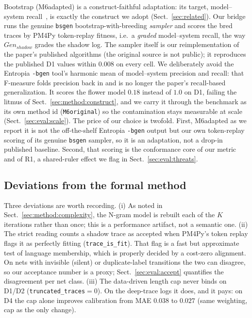 \documentclass[runningheads]{llncs}
\newcommand{\chg}[1]{\textcolor{chgblue}{#1}}
\newcommand{\genshadow}{\ensuremath{\mathit{Gen}_{\mathit{shadow}}}}
\begin{document}
Bootstrap (M6adapted) is a construct-faithful adaptation: its target, model--system recall~\cite{polyvyanyy2022bootstrap}, is exactly the construct we adopt (Sect.~\ref{sec:related}). Our bridge runs the genuine \texttt{bsgen} bootstrap-with-breeding \emph{sampler} and scores the bred traces by PM4Py token-replay fitness, i.e.\ a \emph{graded} model--system recall, the way \genshadow{} grades the shadow log. \chg{The sampler itself is our reimplementation of the paper's published algorithms (the original source is not public); it reproduces the published D1 values within $0.008$ on every cell.} We deliberately avoid the Entropia \texttt{-bgen} tool's harmonic mean of model--system precision and recall: that F-measure folds precision back in and is no longer the paper's recall-based generalization. It scores the flower model $0.18$ instead of $1.0$ on D1, failing the litmus of Sect.~\ref{sec:method:construct}\chg{, and we carry it through the benchmark as its own method id (\texttt{M6original}) so the contamination stays measurable at scale (Sect.~\ref{sec:eval:scale})}. The price of our choice is twofold. First, M6adapted as we report it is not the off-the-shelf Entropia \texttt{-bgen} output but our own token-replay scoring of its genuine \texttt{bsgen} sampler, so it is an adaptation, not a drop-in published baseline. Second, that scoring is the conformance core of our metric and of R1, a shared-ruler effect we flag in Sect.~\ref{sec:eval:threats}.

\subsection{Deviations from the formal method}
\label{sec:impl:deviations}
Three deviations are worth recording. (i) As noted in Sect.~\ref{sec:method:complexity}, the N-gram model is rebuilt each of the $K$ iterations rather than once; this is a performance artifact, not a semantic one. (ii) The strict reading counts a shadow trace as accepted when PM4Py's token replay flags it as perfectly fitting (\texttt{trace\_is\_fit}). That flag is a fast but approximate test of language membership, which is properly decided by a cost-zero alignment. On nets with invisible (silent) or duplicate-label transitions the two can disagree, so our acceptance number is a proxy\chg{; Sect.~\ref{sec:eval:accept} quantifies the disagreement per net class}. (iii) \chg{The data-driven length cap never binds on D1/D2 (\texttt{truncated\_traces}${=}0$). On the deep-trace logs it does, and it pays: on D4 the cap alone improves calibration from MAE $0.038$ to $0.027$ (same weighting, cap as the only change).}
\end{document}
